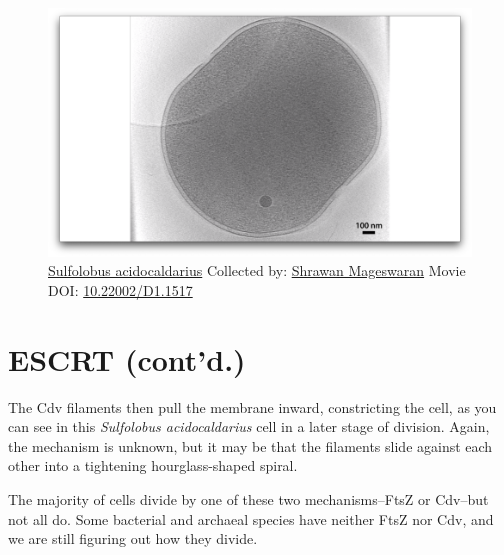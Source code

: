 \documentclass[]{tufte-book}
\begin{document}
\begin{figure}
\includegraphics{movie_stills/5_11} \caption[\protect\hyperlink{tree}{Sulfolobus acidocaldarius} Collected
by: \protect\hyperlink{shrawan_mageswaran}{Shrawan Mageswaran} Movie
DOI: \href{https://doi.org/10.22002/D1.1517}{10.22002/D1.1517}]{\protect\hyperlink{tree}{Sulfolobus acidocaldarius} Collected
by: \protect\hyperlink{shrawan_mageswaran}{Shrawan Mageswaran} Movie
DOI: \href{https://doi.org/10.22002/D1.1517}{10.22002/D1.1517}}\label{fig:5-11}
\end{figure}

\section{ESCRT (cont'd.)}\label{escrt-contd.}

The Cdv filaments then pull the membrane inward, constricting the cell,
as you can see in this \emph{Sulfolobus acidocaldarius} cell in a later
stage of division. Again, the mechanism is unknown, but it may be that
the filaments slide against each other into a tightening
hourglass-shaped spiral.

The majority of cells divide by one of these two mechanisms--FtsZ or
Cdv--but not all do. Some bacterial and archaeal species have neither
FtsZ nor Cdv, and we are still figuring out how they divide.
\end{document}

